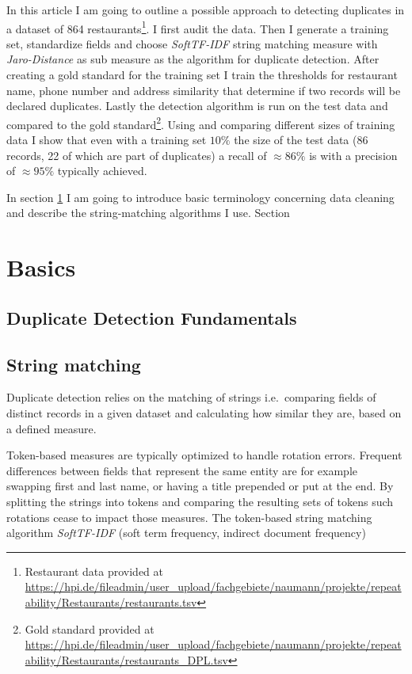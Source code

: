 \documentclass[conference]{IEEEtran}
\begin{document}
In this article I am going to outline a possible approach to detecting duplicates in a dataset of 864 
restaurants\footnote{Restaurant data provided at \url{https://hpi.de/fileadmin/user_upload/fachgebiete/naumann/projekte/repeatability/Restaurants/restaurants.tsv}}.
I first audit the data. Then  I generate a training set, standardize fields and choose \emph{SoftTF-IDF} string matching measure with \emph{Jaro-Distance} as sub measure as the algorithm for duplicate detection. After creating a gold standard for the training set I train the thresholds for restaurant name, phone number and address similarity that determine if two records will be declared duplicates. Lastly the detection algorithm is run on the test data and compared to the gold 
standard\footnote{Gold standard provided at \url{https://hpi.de/fileadmin/user_upload/fachgebiete/naumann/projekte/repeatability/Restaurants/restaurants_DPL.tsv}}.
Using and comparing different sizes of training data I show that even with a training set $10\%$  the size of the test data (86 records, 22 of which are part of duplicates) a recall of $\approx86\%$ is with a precision of $\approx95\%$ typically achieved.

In section \ref{basics} I am going to introduce basic terminology concerning data cleaning and describe the string-matching algorithms I use. Section 
\section{Basics}\label{basics}
\subsection{Duplicate Detection Fundamentals}
\subsection{String matching}
Duplicate detection relies on the matching of strings i.e.\ comparing fields of distinct records in a given dataset and calculating how similar they are, based on a defined measure.

Token-based measures are typically optimized to handle rotation errors. Frequent differences between fields that represent the same entity are for example swapping first and last name, or having a title prepended or put at the end. By splitting the strings into tokens and comparing the resulting sets of tokens such rotations cease to impact those measures. The token-based string matching algorithm \emph{SoftTF-IDF} (soft term frequency, indirect document frequency) 
\end{document}
